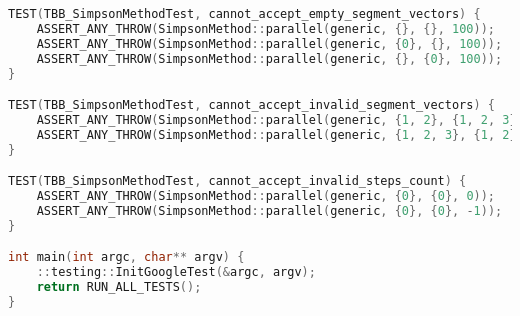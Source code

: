\documentclass{report}
\begin{document}
\begin{lstlisting}[language=C++]
TEST(TBB_SimpsonMethodTest, cannot_accept_empty_segment_vectors) {
    ASSERT_ANY_THROW(SimpsonMethod::parallel(generic, {}, {}, 100));
    ASSERT_ANY_THROW(SimpsonMethod::parallel(generic, {0}, {}, 100));
    ASSERT_ANY_THROW(SimpsonMethod::parallel(generic, {}, {0}, 100));
}

TEST(TBB_SimpsonMethodTest, cannot_accept_invalid_segment_vectors) {
    ASSERT_ANY_THROW(SimpsonMethod::parallel(generic, {1, 2}, {1, 2, 3}, 100));
    ASSERT_ANY_THROW(SimpsonMethod::parallel(generic, {1, 2, 3}, {1, 2}, 100));
}

TEST(TBB_SimpsonMethodTest, cannot_accept_invalid_steps_count) {
    ASSERT_ANY_THROW(SimpsonMethod::parallel(generic, {0}, {0}, 0));
    ASSERT_ANY_THROW(SimpsonMethod::parallel(generic, {0}, {0}, -1));
}

int main(int argc, char** argv) {
    ::testing::InitGoogleTest(&argc, argv);
    return RUN_ALL_TESTS();
}
\end{lstlisting}
\end{document}
